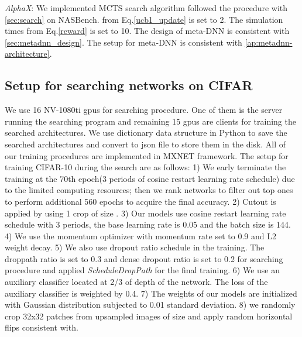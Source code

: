 \documentclass[10pt,twocolumn,letterpaper]{article}
\begin{document}
\textit{AlphaX}: We implemented MCTS search algorithm followed the procedure with \ref{sec:search} on NASBench.  from Eq.\ref{ucb1_update} is set to 2. The simulation times  from Eq.\ref{reward}  is set to 10. The design of meta-DNN is consistent with \ref{sec:metadnn_design}. The setup for meta-DNN is consistent with \ref{ap:metadnn-architecture}. 


\subsection{Setup for searching networks on CIFAR}
\label{ap:mcts_setup_cifar}
We use 16 NV-1080ti gpus for searching procedure. One of them is the server running the searching program and remaining 15 gpus are clients for training the searched architectures. We use dictionary data structure in Python to save the searched architectures and convert to json file to store them in the disk. All of our training procedures are implemented in MXNET framework.
The setup for training CIFAR-10 during the search are as follows: 1) We early terminate the training at the 70th epoch(3 periods of cosine restart learning rate schedule\cite{cosine_restart}) due to the limited computing resources; then we rank networks to filter out top ones to perform additional 560 epochs to acquire the final accuracy.
2) Cutout is applied \cite{zoph2017learning} by using 1 crop of size . 3) Our models use cosine restart learning rate schedule\cite{cosine_restart} with 3 periods, the base learning rate is 0.05 and the batch size is 144. 4) We use the momentum optimizer with momentum rate set to 0.9 and L2 weight decay. 5) We also use dropout ratio schedule in the training. The droppath ratio is set to 0.3 and dense dropout ratio is set to 0.2 for searching procedure and applied \textit{ScheduleDropPath}\cite{zoph2017learning} for the final training. 6) We use an auxiliary classifier located at 2/3 of depth of the network. The loss of the auxiliary classifier is weighted by 0.4\cite{SzegedyVISW15}. 7) The weights of our models are initialized with Gaussian distribution subjected to 0.01 standard deviation. 8) we randomly crop 32x32
patches from upsampled images of size  and apply random horizontal flips consistent with\cite{zoph2017learning}. 
\end{document}
